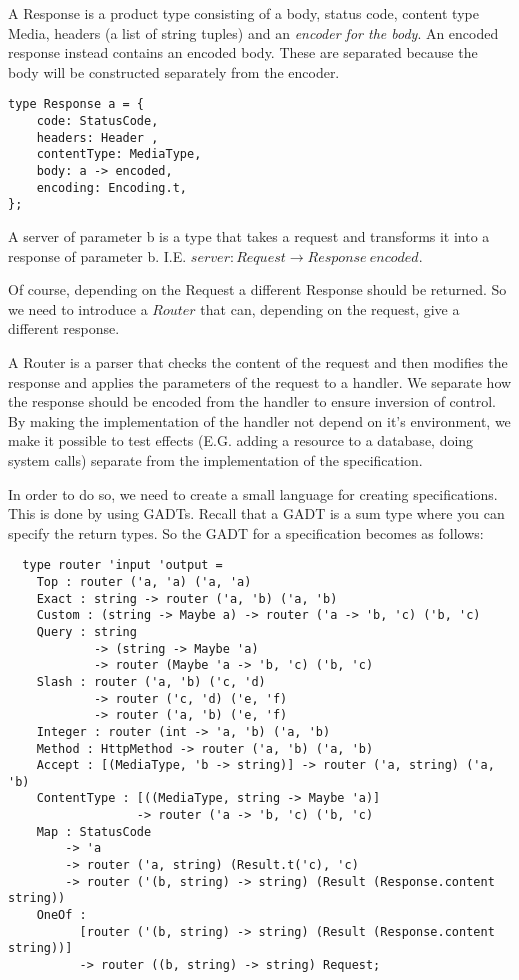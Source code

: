 A Response is a product type consisting of a body, status code, content type
Media, headers (a list of string tuples) and an \textit{encoder for the body}.
An encoded response instead contains an encoded body. These are separated
because the body will be constructed separately from the encoder.

\begin{lstlisting}
type Response a = {
    code: StatusCode,
    headers: Header ,
    contentType: MediaType,
    body: a -> encoded,
    encoding: Encoding.t,
};
\end{lstlisting}

A server of parameter b is a type that takes a request and transforms it into a
response of parameter b. I.E.  $server : Request\rightarrow Response\ encoded$.

Of course, depending on the Request a different Response should be returned. So
we need to introduce a $Router$ that can, depending on the request, give a
different response. 

A Router is a parser that checks the content of the request and then modifies
the response and applies the parameters of the request to a handler. We separate
how the response should be encoded from the handler to ensure inversion of
control. By making the implementation of the handler not depend on it's
environment, we make it possible to test effects (E.G. adding a resource to a
database, doing system calls) separate from the implementation of the
specification. 

In order to do so, we need to create a small language for creating
specifications. This is done by using GADTs. Recall that a GADT is a sum type
where you can specify the return types. So the GADT for a specification becomes
as follows:

\begin{lstlisting}
  type router 'input 'output =
    Top : router ('a, 'a) ('a, 'a)
    Exact : string -> router ('a, 'b) ('a, 'b)
    Custom : (string -> Maybe a) -> router ('a -> 'b, 'c) ('b, 'c)
    Query : string 
            -> (string -> Maybe 'a) 
            -> router (Maybe 'a -> 'b, 'c) ('b, 'c)
    Slash : router ('a, 'b) ('c, 'd) 
            -> router ('c, 'd) ('e, 'f) 
            -> router ('a, 'b) ('e, 'f) 
    Integer : router (int -> 'a, 'b) ('a, 'b)
    Method : HttpMethod -> router ('a, 'b) ('a, 'b)
    Accept : [(MediaType, 'b -> string)] -> router ('a, string) ('a, 'b)
    ContentType : [((MediaType, string -> Maybe 'a)]
                  -> router ('a -> 'b, 'c) ('b, 'c)
    Map : StatusCode 
        -> 'a 
        -> router ('a, string) (Result.t('c), 'c)
        -> router ('(b, string) -> string) (Result (Response.content string))
    OneOf :
          [router ('(b, string) -> string) (Result (Response.content string))]
          -> router ((b, string) -> string) Request;
\end{lstlisting}


